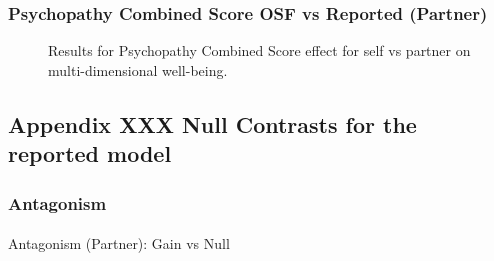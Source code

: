 \documentclass[
  singlecolumn]{article}
\makeatletter
\let\oldparagraph\paragraph
\renewcommand{\paragraph}{
    \@ifstar
      \xxxParagraphStar
      \xxxParagraphNoStar
  }
\newcommand{\xxxParagraphStar}[1]{\oldparagraph*{#1}\mbox{}}
\newcommand{\xxxParagraphNoStar}[1]{\oldparagraph{#1}\mbox{}}
\makeatother
\begin{document}
\subsubsection{Psychopathy Combined Score OSF vs Reported
(Partner)}\label{psychopathy-combined-score-osf-vs-reported-partner}

\begin{figure}


\caption{\label{fig-results-psychopathy-osf-compare}Results for
Psychopathy Combined Score effect for self vs partner on
multi-dimensional well-being.}

\end{figure}%

\subsection{Appendix XXX Null Contrasts for the reported
model}\label{appendix-xxx-null-contrasts-for-the-reported-model}

\subsubsection{Antagonism}\label{antagonism-1}

\paragraph{Antagonism (Partner): Gain vs
Null}\label{antagonism-partner-gain-vs-null}
\end{document}
